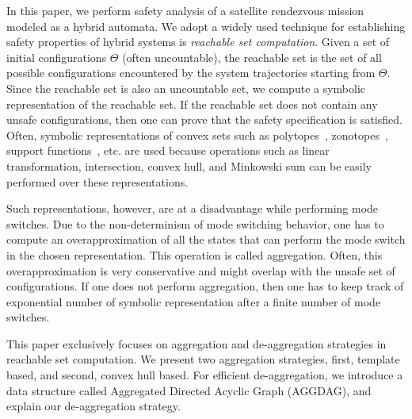 In this paper, we perform safety analysis of a satellite rendezvous mission modeled as a hybrid automata.
%
We adopt a widely used technique for establishing safety properties of hybrid systems is {\em reachable set computation}.
%
%
Given a set of initial configurations $\Theta$ (often uncountable), the reachable set is the set of all possible configurations encountered by the system trajectories starting from $\Theta$. 
%
Since the reachable set is also an uncountable set, we compute a symbolic representation of the reachable set.
%
If the reachable set does not contain any unsafe configurations, then one can prove that the safety specification is satisfied.
%
Often, symbolic representations of convex sets such as polytopes~\cite{Frehse05_phaver}, zonotopes~\cite{girard2006efficient}, support functions~\cite{spaceex}, etc. are used because operations such as linear transformation, intersection, convex hull, and Minkowski sum can be easily performed over these representations.
%

Such representations, however, are at a disadvantage while performing mode switches.
%
Due to the non-determinism of mode switching behavior, one has to compute an overapproximation of all the states that can perform the mode switch in the chosen representation.
%
This operation is called aggregation.
%
Often, this overapproximation is very conservative and might overlap with the unsafe set of configurations.
%
If one does not perform aggregation, then one has to keep track of exponential number of symbolic representation after a finite number of mode switches.

This paper exclusively focuses on aggregation and de-aggregation strategies in reachable set computation. 
%
We present two aggregation strategies, first, template based, and second, convex hull based. 
%
For efficient de-aggregation, we introduce a data structure called Aggregated Directed Acyclic Graph (AGGDAG), and explain our de-aggregation strategy.
%

